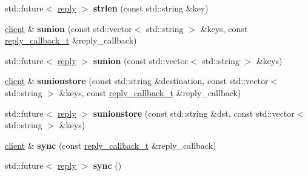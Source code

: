 \begin{DoxyCompactItemize}
\item 
\mbox{\label{classcpp__redis_1_1client_a6b9f2a3a8952de874a9a6e1555c85195}} 
std\+::future$<$ \hyperlink{classcpp__redis_1_1reply}{reply} $>$ {\bfseries strlen} (const std\+::string \&key)
\item 
\mbox{\label{classcpp__redis_1_1client_a7128cdf97d9f768b117bab5843059fe1}} 
\hyperlink{classcpp__redis_1_1client}{client} \& {\bfseries sunion} (const std\+::vector$<$ std\+::string $>$ \&keys, const \hyperlink{classcpp__redis_1_1client_a061a1140d36d2eaeda82b09a0bb3f9f2}{reply\+\_\+callback\+\_\+t} \&reply\+\_\+callback)
\item 
\mbox{\label{classcpp__redis_1_1client_a7f76d091899206932d250edf3f990e94}} 
std\+::future$<$ \hyperlink{classcpp__redis_1_1reply}{reply} $>$ {\bfseries sunion} (const std\+::vector$<$ std\+::string $>$ \&keys)
\item 
\mbox{\label{classcpp__redis_1_1client_a26f38c6a8b7f03cd6ec9d5e4d121be32}} 
\hyperlink{classcpp__redis_1_1client}{client} \& {\bfseries sunionstore} (const std\+::string \&destination, const std\+::vector$<$ std\+::string $>$ \&keys, const \hyperlink{classcpp__redis_1_1client_a061a1140d36d2eaeda82b09a0bb3f9f2}{reply\+\_\+callback\+\_\+t} \&reply\+\_\+callback)
\item 
\mbox{\label{classcpp__redis_1_1client_af71da68029a24b52a5005a24c859893d}} 
std\+::future$<$ \hyperlink{classcpp__redis_1_1reply}{reply} $>$ {\bfseries sunionstore} (const std\+::string \&dst, const std\+::vector$<$ std\+::string $>$ \&keys)
\item 
\mbox{\label{classcpp__redis_1_1client_a47d8402e7fa9f7b8a021356baf83fd1f}} 
\hyperlink{classcpp__redis_1_1client}{client} \& {\bfseries sync} (const \hyperlink{classcpp__redis_1_1client_a061a1140d36d2eaeda82b09a0bb3f9f2}{reply\+\_\+callback\+\_\+t} \&reply\+\_\+callback)
\item 
\mbox{\label{classcpp__redis_1_1client_a09c4ffbad45c8ee8a171333ed81c8d43}} 
std\+::future$<$ \hyperlink{classcpp__redis_1_1reply}{reply} $>$ {\bfseries sync} ()
\item 

\end{DoxyCompactItemize}
